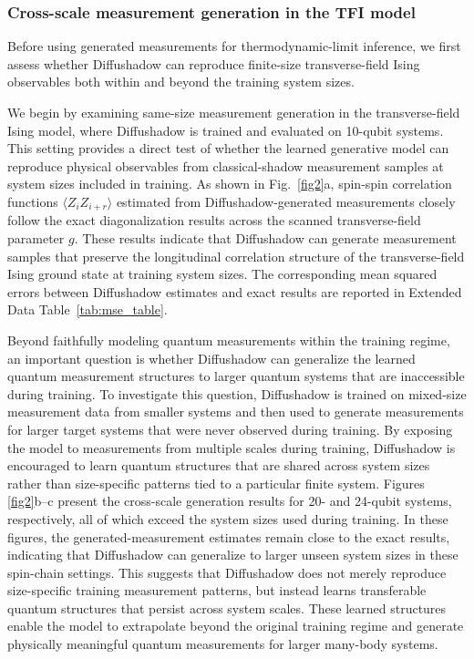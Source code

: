 \documentclass[pdflatex,sn-mathphys-num]{sn-jnl}%
\theoremstyle{thmstyleone}%
\theoremstyle{thmstyletwo}%
\theoremstyle{thmstylethree}%
\begin{document}
\subsubsection{Cross-scale measurement generation in the TFI model}

Before using generated measurements for thermodynamic-limit inference, we first assess whether Diffushadow can reproduce finite-size transverse-field Ising observables both within and beyond the training system sizes.

We begin by examining same-size measurement generation in the transverse-field Ising model, where Diffushadow is trained and evaluated on 10-qubit systems. This setting provides a direct test of whether the learned generative model can reproduce physical observables from classical-shadow measurement samples at system sizes included in training. As shown in Fig.~\ref{fig2}a, spin-spin correlation functions \(\langle Z_i Z_{i+r}\rangle\) estimated from Diffushadow-generated measurements closely follow the exact diagonalization results across the scanned transverse-field parameter \(g\). These results indicate that Diffushadow can generate measurement samples that preserve the longitudinal correlation structure of the transverse-field Ising ground state at training system sizes. The corresponding mean squared errors between Diffushadow estimates and exact results are reported in Extended Data Table~\ref{tab:mse_table}.

Beyond faithfully modeling quantum measurements within the training regime, an important question is whether Diffushadow can generalize the learned quantum measurement structures to larger quantum systems that are inaccessible during training. To investigate this question, Diffushadow is trained on mixed-size measurement data from smaller systems and then used to generate measurements for larger target systems that were never observed during training. 
By exposing the model to measurements from multiple scales during training, Diffushadow is encouraged to learn quantum structures that are shared across system sizes rather than size-specific patterns tied to a particular finite system.
Figures \ref{fig2}b--c present the cross-scale generation results for 20- and 24-qubit systems, respectively, all of which exceed the system sizes used during training. In these figures, the generated-measurement estimates remain close to the exact results, indicating that Diffushadow can generalize to larger unseen system sizes in these spin-chain settings. This suggests that Diffushadow does not merely reproduce size-specific training measurement patterns, but instead learns transferable quantum structures that persist across system scales. These learned structures enable the model to extrapolate beyond the original training regime and generate physically meaningful quantum measurements for larger many-body systems.
\end{document}
